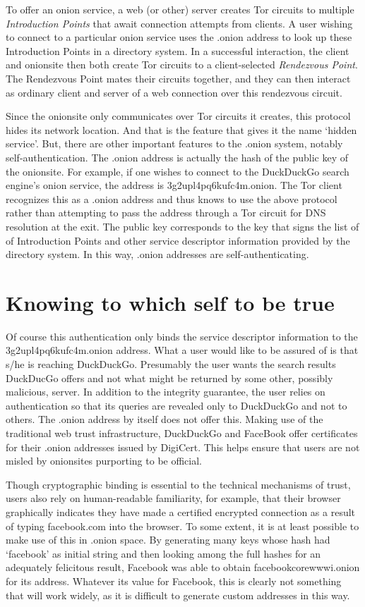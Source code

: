 \documentclass[10pt, conference, compsocconf]{styles/IEEEtran}
\begin{document}
To offer an onion service, a web (or other) server creates Tor circuits to
multiple \emph{Introduction Points} that await connection attempts
from clients. A user wishing to connect to a particular onion service
uses the .onion address to look up these Introduction Points in a
directory system. In a successful interaction, the client and
onionsite then both create Tor circuits to a client-selected
\emph{Rendezvous Point}. The Rendezvous Point mates their circuits
together, and they can then interact as ordinary client and server of
a web connection over this rendezvous circuit.

Since the onionsite only communicates over Tor circuits it creates,
this protocol hides its network location. And that is the feature that
gives it the name `hidden service'. But, there are other important
features to the .onion system, notably self-authentication. The .onion
address is actually the hash of the public key of the onionsite. For
example, if one wishes to connect to the DuckDuckGo search engine's
onion service, the address is 3g2upl4pq6kufc4m.onion. The Tor client
recognizes this as a .onion address and thus knows to use the above
protocol rather than attempting to pass the address through a Tor
circuit for DNS resolution at the exit. The public key
corresponds to the key that signs the list of of Introduction Points
and other service descriptor information provided by the directory
system. In this way, .onion addresses are self-authenticating.

\section{Knowing to which self to be true}

Of course this authentication only binds the service descriptor
information to the 3g2upl4pq6kufc4m.onion address. What a user would
like to be assured of is that s/he is reaching DuckDuckGo. Presumably
the user wants the search results DuckDucGo offers and not what might
be returned by some other, possibly malicious, server.  In addition to
the integrity guarantee, the user relies on authentication so that its
queries are revealed only to DuckDuckGo and not to others. The .onion
address by itself does not offer this. Making use of the traditional
web trust infrastructure, DuckDuckGo and FaceBook offer certificates
for their .onion addresses issued by DigiCert.  This helps ensure that
users are not misled by onionsites purporting to be official.

Though cryptographic binding is essential to the technical mechanisms
of trust, users also rely on human-readable familiarity, for example,
that their browser graphically indicates they have made a certified
encrypted connection as a result of typing facebook.com into the
browser.  To some extent, it is at least possible to make use of this
in .onion space. By generating many keys whose hash had `facebook' as
initial string and then looking among the full hashes for an
adequately felicitous result, Facebook was able to obtain
facebookcorewwwi.onion for its address. Whatever its value for
Facebook, this is clearly not something that will work widely, as it
is difficult to generate custom addresses in this way.
\end{document}
